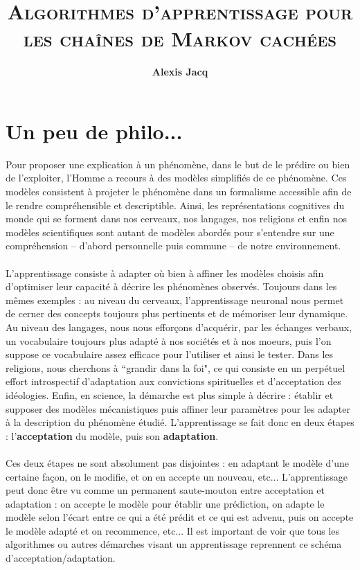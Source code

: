 \documentclass{article}
\title{\textbf{\textsc{Algorithmes d'apprentissage pour les chaînes de Markov
cachées}}\vspace{4mm}}
\author{\textbf{Alexis Jacq}\vspace{4mm}}
\begin{document}
\maketitle

\section{Un peu de philo...}
Pour proposer une explication à un phénomène, dans le but de le prédire ou bien de l'exploiter, l'Homme a recours à des modèles simplifiés de ce phénomène. Ces modèles consistent à projeter le phénomène dans un formalisme accessible afin de le rendre compréhensible et descriptible.  Ainsi, les représentations cognitives du monde qui se forment dans nos cerveaux, nos langages, nos religions et enfin nos modèles scientifiques sont autant de modèles abordés pour s'entendre sur une compréhension -- d'abord personnelle puis commune -- de notre environnement. \\
\\
L'apprentissage consiste à adapter où bien à affiner les modèles choisis afin d'optimiser leur capacité à décrire les phénomènes observés. Toujours dans les mêmes exemples : au niveau du cerveaux, l'apprentissage neuronal nous permet de cerner des concepts toujours plus pertinents et de mémoriser leur dynamique. Au niveau des langages, nous nous efforçons d’acquérir, par les échanges verbaux, un vocabulaire toujours plus adapté à nos sociétés et à nos moeurs, puis l'on suppose ce vocabulaire assez efficace pour l'utiliser et ainsi le tester. Dans les religions, nous cherchons à ``grandir dans la foi", ce qui consiste en un perpétuel effort introspectif d'adaptation aux convictions spirituelles et d'acceptation des idéologies. Enfin, en science, la démarche est plus simple à décrire : établir et supposer des modèles mécanistiques puis affiner leur paramètres pour les adapter à la description du phénomène étudié. L'apprentissage se fait donc en deux étapes : l'\textbf{acceptation} du modèle, puis son \textbf{adaptation}. \\
\\
Ces deux étapes ne sont absolument pas disjointes : en adaptant le modèle d'une certaine façon, on le modifie, et on en accepte un nouveau, etc... L'apprentissage peut donc \^etre vu comme un permanent saute-mouton entre acceptation et adaptation : on accepte le modèle pour établir une prédiction, on adapte le modèle selon l'écart entre ce qui a été prédit et ce qui est advenu, puis on accepte le modèle adapté et on recommence, etc... Il est important de voir que tous les algorithmes ou autres démarches visant un apprentissage reprennent ce schéma d'acceptation/adaptation. 
\end{document}

